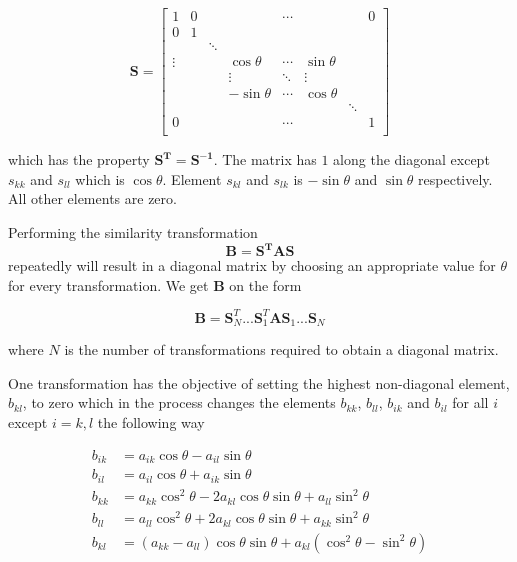 \documentclass{article}
\begin{document}
\begin{equation*}
\mathbf{S}=\begin{bmatrix}
1 & 0 & & & \cdots & & & 0\\
0 & 1 & & & & & \\
 &  &\ddots & & & & &\\
\vdots &  & & \cos\theta & \cdots & \sin\theta & &\\
 & & &\vdots & \ddots & \vdots & &\\
 & & & -\sin\theta & \cdots & \cos\theta & & \\
 & & & & & & \ddots & \\
0 &  & & & \cdots  & & & 1\\
\end{bmatrix}
\end{equation*}

which has the property $\mathbf{S^T}=\mathbf{S^{-1}}$. The matrix has $1$ along the diagonal except $s_{kk}$ and $s_{ll}$ which is $\cos\theta$. Element $s_{kl}$ and $s_{lk}$ is $-\sin\theta$ and $\sin\theta$ respectively. All other elements are zero.

Performing the similarity transformation 
$$\mathbf{B}=\mathbf{S^TAS}$$
repeatedly will result in a diagonal matrix by choosing an appropriate value for $\theta$ for every transformation. We get $\mathbf{B}$ on the form

$$\mathbf{B}=\mathbf{S}^T_N...\mathbf{S}^T_1\mathbf{A}\mathbf{S}_1...\mathbf{S}_N$$

where $N$ is the number of transformations required to obtain a diagonal matrix.

One transformation has the objective of setting the highest non-diagonal element, $b_{kl}$, to zero which in the process changes the elements $b_{kk}$, $b_{ll}$, $b_{ik}$ and $b_{il}$ for all $i$ except $i=k,l$ the following way

\begin{equation*}
\begin{split}
b_{ik}&=a_{ik}\cos\theta-a_{il}\sin\theta\\
b_{il}&=a_{il}\cos\theta+a_{ik}\sin\theta\\
b_{kk}&=a_{kk}\cos^2\theta-2a_{kl}\cos\theta\sin\theta+a_{ll}\sin^2\theta\\
b_{ll}&=a_{ll}\cos^2\theta+2a_{kl}\cos\theta\sin\theta+a_{kk}\sin^2\theta\\
b_{kl}&=(a_{kk}-a_{ll})\cos\theta\sin\theta+a_{kl}(\cos^2\theta-\sin^2\theta)\\
\end{split}
\end{equation*}
\end{document}
